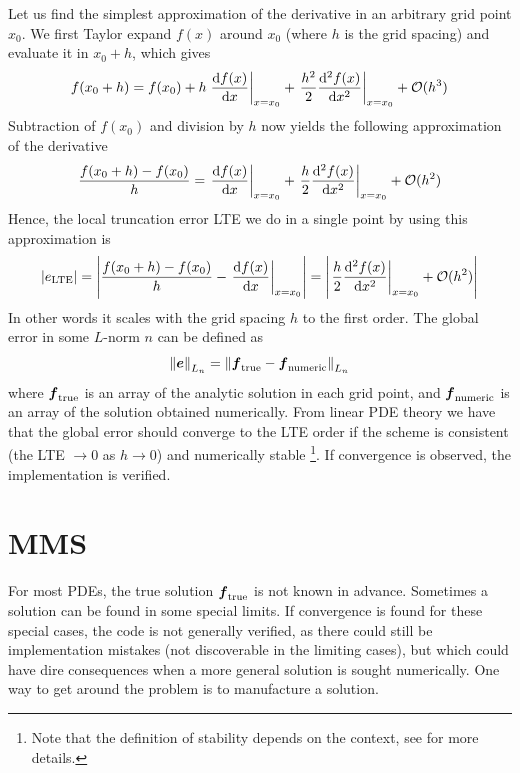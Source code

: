 Let us find the simplest approximation of the derivative in an arbitrary grid point $x_0$.
We first Taylor expand $f(x)$ around $x_0$ (where $h$ is the grid spacing) and evaluate it in $x_0 + h$, which gives
%
\begin{align*}
    f(x_0+h)
    = f(x_0)
    + h \left.\frac{\text{d}{f(x)}}{\text{d}{x}}\right|_{x=x_0}
    + \left.\frac{h^2}{2}\frac{\text{d}{^2f(x)}}{\text{d}{x^2}}\right|_{x=x_0}
    + \mathcal{O}(h^3)
\end{align*}
%
Subtraction of $f(x_0)$ and division by $h$ now yields the following approximation of the derivative
%
\begin{align*}
    \frac{f(x_0+h) - f(x_0)}{h}
    =  \left.\frac{\text{d}{f(x)}}{\text{d}{x}}\right|_{x=x_0}
    + \left.\frac{h}{2}\frac{\text{d}{^2f(x)}}{\text{d}{x^2}}\right|_{x=x_0}
    + \mathcal{O}(h^2)
\end{align*}
%
Hence, the local truncation error LTE we do in a single point by using this approximation is
%
\begin{align*}
    |e_{\text{LTE}}|
    =
    \left|\frac{f(x_0+h) - f(x_0)}{h} - \left.\frac{\text{d}{f(x)}}{\text{d}{x}}\right|_{x=x_0}\right|
    =
    \left| \left.\frac{h}{2}\frac{\text{d}{^2f(x)}}{\text{d}{x^2}}\right|_{x=x_0}
    + \mathcal{O}(h^2)\right|
\end{align*}
%
In other words it scales with the grid spacing $h$ to the first order.
The global error in some $L$-norm $n$ can be defined as
%
\begin{align*}
    \left\|\boldsymbol{e}\right\|_{L_n} =
    \left\|\boldsymbol{f}_{\text{true}} - \boldsymbol{f}_{\text{numeric}}\right\|_{L_n}
\end{align*}
%
where $\boldsymbol{f}_{\text{true}}$ is an array of the analytic solution in each grid point, and $\boldsymbol{f}_{\text{numeric}}$ is an array of the solution obtained numerically.
From linear PDE theory we have that the global error should converge to the LTE order if the scheme is consistent (the LTE $\to 0$ as $h\to 0$) and numerically stable%
\footnote{Note that the definition of stability depends on the context, see \cite{Leveque2007book} for more details.}.
%
If convergence is observed, the implementation is verified.

\section{MMS}
\label{sec:MMS}
For most PDEs, the true solution $\boldsymbol{f}_{\text{true}}$ is not known in advance.
Sometimes a solution can be found in some special limits.
If convergence is found for these special cases, the code is not generally verified, as there could still be implementation mistakes (not discoverable in the limiting cases), but which could have dire consequences when a more general solution is sought numerically.
One way to get around the problem is to manufacture a solution.

